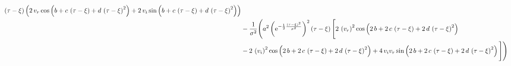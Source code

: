 \begin{landscape}
\begin{align}
 \left( \tau-\xi \right)  \left( 2\,v_r \cos \left( b+c\, \left( \tau-\xi \right) +d\, \left( \tau-{
 \xi} \right) ^{2} \right) +2\,v_i 
\sin \left( b+c\, \left( \tau-\xi \right) +d\, \left( \tau-\xi
 \right) ^{2} \right)  \right)\nonumber \\
&- \frac{1}{ {
\sigma}^{2}} \Bigg( {a}^{2} \left( {{\rm e}^{
-\frac{1}{2}{\frac { \left( \tau-\xi \right) ^{2}}{{\sigma}^{2}}}}}
 \right) ^{2} \left( \tau-\xi \right)  \Bigg[ 2\, \left( v_r \right) ^{2}\cos \left( 2\,b+2\,c\, \left( \tau
-{ \xi} \right) +2\,d\, \left( \tau-\xi \right) ^{2} \right) \nonumber \\
& -2\,
 \left( v_i  \right) ^{2}\cos \left( 2
\,b+2\,c\, \left( \tau-\xi \right) +2\,d\, \left( \tau-\xi
 \right) ^{2} \right) +4\,v_i v_r \sin \left( 2\,b+2\,c\, \left( \tau-\xi
 \right) +2\,d\, \left( \tau-\xi \right) ^{2} \right)  \Bigg] \Bigg)
\end{align}


\end{landscape}